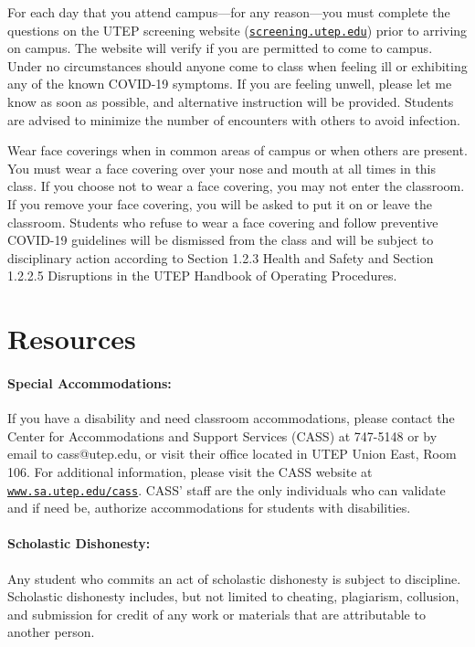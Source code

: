 \documentclass[12pt]{scrartcl}
\begin{document}
For each day that you attend campus—for any reason—you must complete the questions on the UTEP screening website (\href{http://screening.utep.edu}{\texttt{screening.utep.edu}}) prior to arriving on campus. 
The website will verify if you are permitted to come to campus. 
Under no circumstances should anyone come to class when feeling ill or exhibiting any of the known COVID-19 symptoms. 
If you are feeling unwell, please let me know as soon as possible, 
and alternative instruction will be provided. Students are advised to minimize the number of encounters with others to avoid infection.

Wear face coverings when in common areas of campus or when others are present. 
You must wear a face covering over your nose and mouth at all times in this class. 
If you choose not to wear a face covering, you may not enter the classroom. 
If you remove your face covering, you will be asked to put it on or leave the classroom. 
Students who refuse to wear a face covering and follow preventive COVID-19 guidelines will be dismissed from the class and will be subject to disciplinary action according to Section 1.2.3 Health and Safety and Section 1.2.2.5 Disruptions in the UTEP Handbook of Operating Procedures.


\section{Resources}

\paragraph{Special Accommodations: }
If you have a disability and need classroom accommodations, please contact the Center for Accommodations and Support Services (CASS) at 747-5148 or by email to cass@utep.edu, or visit their office located in UTEP Union East, Room 106. For additional information, please visit the CASS website at \href{http://www.sa.utep.edu/cass}{\texttt{www.sa.utep.edu/cass}}. CASS’ staff are the only individuals who can validate and if need be, authorize accommodations for students with disabilities.


\paragraph{Scholastic Dishonesty: }
Any student who commits an act of scholastic dishonesty is subject to discipline. Scholastic dishonesty includes, but not limited to cheating, plagiarism, collusion, and submission for credit of any work or materials that are attributable to another person.
\end{document}
